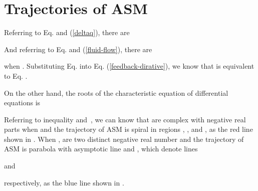 \documentclass{sig-alternate-10pt}
\begin{document}
\section{Trajectories of ASM}
Referring to Eq.  and (\ref{deltaq}), there are 

And referring to Eq.  and (\ref{fluid-flow}), there are

when . Substituting Eq.  into Eq. (\ref{feedback-dirative}), we know that  is equivalent to Eq. .

On the other hand, the roots of the characteristic equation of differential equations  is

Referring to inequality  and~\cite{Itkis}, we can know that  are complex with negative real parts when  and the trajectory of ASM is spiral in regions , ,  and , as the red line shown in . When ,  are two distinct negative real number and the trajectory of ASM is parabola with asymptotic line  and , which denote lines 

and

respectively, as the blue line shown in .
\end{document}

